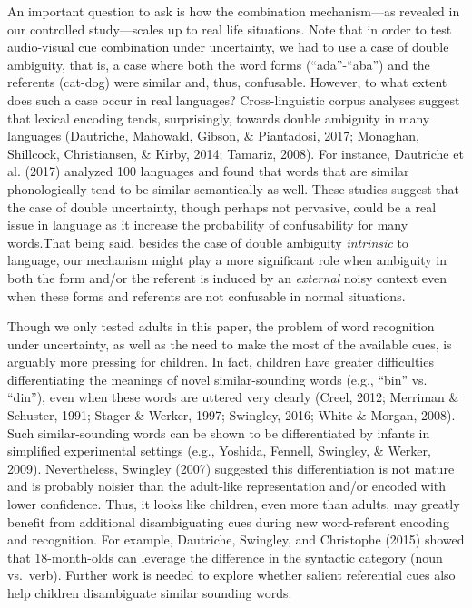 \documentclass[english,floatsintext,man]{apa6}
\theoremstyle{definition}
\theoremstyle{definition}
\theoremstyle{definition}
\theoremstyle{remark}
\begin{document}
An important question to ask is how the combination mechanism---as
revealed in our controlled study---scales up to real life situations.
Note that in order to test audio-visual cue combination under
uncertainty, we had to use a case of double ambiguity, that is, a case
where both the word forms (\enquote{ada}-\enquote{aba}) and the
referents (cat-dog) were similar and, thus, confusable. However, to what
extent does such a case occur in real languages? Cross-linguistic corpus
analyses suggest that lexical encoding tends, surprisingly, towards
double ambiguity in many languages (Dautriche, Mahowald, Gibson, \&
Piantadosi, 2017; Monaghan, Shillcock, Christiansen, \& Kirby, 2014;
Tamariz, 2008). For instance, Dautriche et al. (2017) analyzed 100
languages and found that words that are similar phonologically tend to
be similar semantically as well. These studies suggest that the case of
double uncertainty, though perhaps not pervasive, could be a real issue
in language as it increase the probability of confusability for many
words.\linebreak That being said, besides the case of double ambiguity
\emph{intrinsic} to language, our mechanism might play a more
significant role when ambiguity in both the form and/or the referent is
induced by an \emph{external} noisy context even when these forms and
referents are not confusable in normal situations.

Though we only tested adults in this paper, the problem of word
recognition under uncertainty, as well as the need to make the most of
the available cues, is arguably more pressing for children. In fact,
children have greater difficulties differentiating the meanings of novel
similar-sounding words (e.g., \enquote{bin} vs. \enquote{din}), even
when these words are uttered very clearly (Creel, 2012; Merriman \&
Schuster, 1991; Stager \& Werker, 1997; Swingley, 2016; White \& Morgan,
2008). Such similar-sounding words can be shown to be differentiated by
infants in simplified experimental settings (e.g., Yoshida, Fennell,
Swingley, \& Werker, 2009). Nevertheless, Swingley (2007) suggested this
differentiation is not mature and is probably noisier than the
adult-like representation and/or encoded with lower confidence. Thus, it
looks like children, even more than adults, may greatly benefit from
additional disambiguating cues during new word-referent encoding and
recognition. For example, Dautriche, Swingley, and Christophe (2015)
showed that 18-month-olds can leverage the difference in the syntactic
category (noun vs.~verb). Further work is needed to explore whether
salient referential cues also help children disambiguate similar
sounding words.
\end{document}

